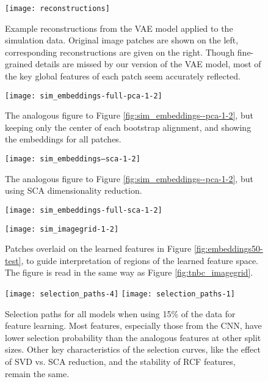 \begin{figure}
\texttt{[image: reconstructions]}
\caption{Example reconstructions from the VAE model applied to the simulation
  data. Original image patches are shown on the left, corresponding
  reconstructions are given on the right. Though fine-grained details are missed
  by our version of the VAE model, most of the key global features of each patch
  seem accurately reflected.}
\label{fig:reconstructions}
\end{figure}

\begin{figure}
  \centering
  \texttt{[image: sim\_embeddings-full-pca-1-2]}
  \caption{The analogous figure to Figure \ref{fig:sim_embeddings--pca-1-2}, but
    keeping only the center of each bootstrap alignment, and showing the
    embeddings for all patches.}
  \label{fig:sim_embeddings-full-pca-1-2}
\end{figure}

\begin{figure}
  \centering
  \texttt{[image: sim\_embeddings--sca-1-2]}
  \caption{The analogous figure to Figure \ref{fig:sim_embeddings--pca-1-2}, but
    using SCA dimensionality reduction.}
  \label{fig:sim_embeddings--sca-1-2}
\end{figure}

\begin{figure}
  \centering
  \texttt{[image: sim\_embeddings-full-sca-1-2]}
  \caption{}
  \label{sim_embeddings-full-sca-1-2}
\end{figure}

\begin{figure}
  \centering
  \texttt{[image: sim\_imagegrid-1-2]}
  \caption{Patches overlaid on the learned features in Figure
    \ref{fig:embeddings50-test}, to guide interpretation of regions of the
    learned feature space. The figure is read in the same way as Figure
    \ref{fig:tnbc_imagegrid}.}
  \label{fig:sim_imagegrid-1-2}
\end{figure}

\begin{figure}
  \centering
  \texttt{[image: selection\_paths-4]}
  \texttt{[image: selection\_paths-1]}
  \caption{Selection paths for all models when using 15\% of the data for
    feature learning. Most features, especially those from the CNN, have lower selection
    probability than the analogous features at other split sizes. Other key
    characteristics of the selection curves, like the effect of SVD vs. SCA
    reduction, and the stability of RCF features, remain the same.}
  \label{fig:selection_paths15}
\end{figure}

